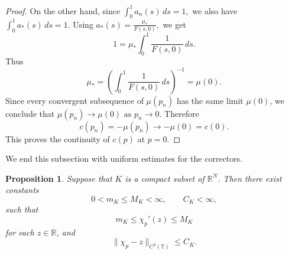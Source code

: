 \documentclass[preprint]{elsarticle}
\newtheorem{proposition}{Proposition}[section]
\numberwithin{equation}{section}
\begin{document}
\begin{proof}
On the other hand, since
$
\int_0^1 a_n(s)\,ds=1,
$
we also have $\int_0^1 a_*(s)\,ds=1.$
Using
$
a_*(s)=\frac{\mu_*}{F(s,0)},
$
we get
\begin{equation*}
1
=
\mu_*\int_0^1\frac{1}{F(s,0)}\,ds.
\end{equation*}
Thus
\begin{equation*}
\mu_*
=
\left(
\int_0^1\frac{1}{F(s,0)}\,ds
\right)^{-1}
=
\mu(0).
\end{equation*}
Since every convergent subsequence of $\mu(p_n)$ has the same limit $\mu(0)$, we conclude that $\mu(p_n)\to\mu(0)
\text{ as }p_n\to0.$
Therefore
\begin{equation*}
c(p_n)=-\mu(p_n)\to-\mu(0)=c(0).
\end{equation*}
This proves the continuity of $c(p)$ at $p=0$.
\end{proof}
We end this subsection with uniform estimates for the correctors.
\begin{proposition}
 Suppose that $K$ is a compact subset of $\mathbb R^N$. Then there exist constants
$$
0<m_K\le M_K<\infty,
\qquad
C_K<\infty,
$$
such that
\begin{equation*}
m_K\le \chi_p'(z)\le M_K
\end{equation*}
for each $z\in\mathbb R$, and
\begin{equation*}
\|\chi_p-z\|_{C^2(\mathbb T)}\le C_K.
\end{equation*}\label{Bound}
\end{proposition}
\end{document}
